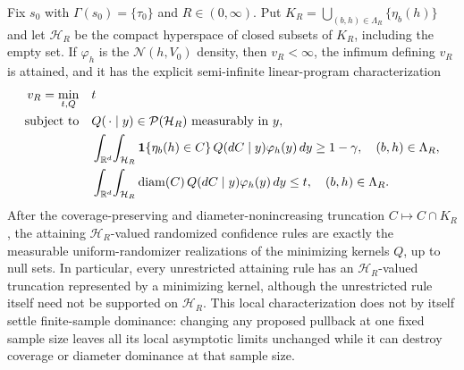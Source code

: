 Fix \(s_0\) with \(\Gamma(s_0)=\{\tau_0\}\) and \(R\in(0,\infty)\).  Put \(K_R=\bigcup_{(b,h)\in\Lambda_R}\{\eta_b(h)\}\) and let \(\mathcal H_R\) be the compact hyperspace of closed subsets of \(K_R\), including the empty set.  If \(\varphi_h\) is the \(\mathcal N(h,V_0)\) density, then \(v_R<\infty\), the infimum defining \(v_R\) is attained, and it has the explicit semi-infinite linear-program characterization
\[
\begin{aligned}
v_R=\min_{t,Q}\quad &t\\
\text{subject to}\quad
&Q(\,\cdot\mid y)\in\mathcal P(\mathcal H_R)\text{ measurably in }y,\\
&\int_{\mathbb R^d}\!\int_{\mathcal H_R}
  {\bf1}\{\eta_b(h)\in C\}\,Q(dC\mid y)\varphi_h(y)\,dy
  \ge1-\gamma,\quad (b,h)\in\Lambda_R,\\
&\int_{\mathbb R^d}\!\int_{\mathcal H_R}
  \operatorname{diam}(C)\,Q(dC\mid y)\varphi_h(y)\,dy
  \le t,\quad (b,h)\in\Lambda_R.
\end{aligned}
\]
After the coverage-preserving and diameter-nonincreasing truncation \(C\mapsto C\cap K_R\), the attaining \(\mathcal H_R\)-valued randomized confidence rules are exactly the measurable uniform-randomizer realizations of the minimizing kernels \(Q\), up to null sets.  In particular, every unrestricted attaining rule has an \(\mathcal H_R\)-valued truncation represented by a minimizing kernel, although the unrestricted rule itself need not be supported on \(\mathcal H_R\).  This local characterization does not by itself settle finite-sample dominance: changing any proposed pullback at one fixed sample size leaves all its local asymptotic limits unchanged while it can destroy coverage or diameter dominance at that sample size.